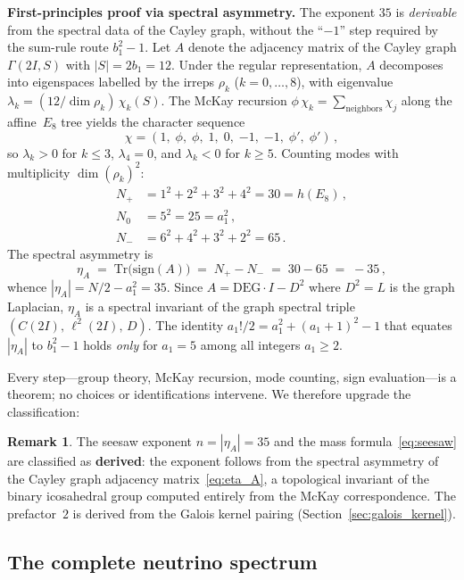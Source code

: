\documentclass[12pt,a4paper]{article}
\theoremstyle{definition}
\newtheorem{remark}{Remark}
\begin{document}
\textbf{First-principles proof via spectral asymmetry.}
The exponent $35$ is \emph{derivable} from the spectral data of the Cayley graph, without the ``$-1$'' step required by the sum-rule route $b_1^2 - 1$.  Let $A$ denote the adjacency matrix of the Cayley graph $\Gamma(2I, S)$ with $|S| = 2b_1 = 12$.  Under the regular representation, $A$ decomposes into eigenspaces labelled by the irreps $\rho_k$ ($k = 0, \ldots, 8$), with eigenvalue $\lambda_k = (12/\dim\rho_k)\,\chi_k(S)$.  The McKay recursion $\phi\,\chi_k = \sum_{\text{neighbors}}\chi_j$ along the affine~$E_8$ tree yields the character sequence
\[
\chi = (1,\;\phi,\;\phi,\;1,\;0,\;{-1},\;{-1},\;\phi',\;\phi')\,,
\]
so $\lambda_k > 0$ for $k \le 3$, $\lambda_4 = 0$, and $\lambda_k < 0$ for $k \ge 5$.  Counting modes with multiplicity $\dim(\rho_k)^2$:
\begin{align}
N_+ &= 1^2 + 2^2 + 3^2 + 4^2 = 30 = h(E_8)\,,\\
N_0 &= 5^2 = 25 = a_1^2\,,\\
N_- &= 6^2 + 4^2 + 3^2 + 2^2 = 65\,.
\end{align}
The spectral asymmetry is
\begin{equation}
\eta_A \;=\; \mathrm{Tr}\bigl(\mathrm{sign}(A)\bigr) \;=\; N_+ - N_- \;=\; 30 - 65 \;=\; -35\,,
\label{eq:eta_A}
\end{equation}
whence $|\eta_A| = N/2 - a_1^2 = 35$.  Since $A = \mathrm{DEG}\cdot I - D^2$ where $D^2 = L$ is the graph Laplacian, $\eta_A$ is a spectral invariant of the graph spectral triple $(C(2I),\,\ell^2(2I),\,D)$.  The identity $a_1!/2 = a_1^2 + (a_1{+}1)^2 - 1$ that equates $|\eta_A|$ to $b_1^2 - 1$ holds \emph{only} for $a_1 = 5$ among all integers $a_1 \ge 2$.

Every step---group theory, McKay recursion, mode counting, sign evaluation---is a theorem; no choices or identifications intervene.  We therefore upgrade the classification:

\begin{remark}
The seesaw exponent $n = |\eta_A| = 35$ and the mass formula~\eqref{eq:seesaw} are classified as \textbf{derived}: the exponent follows from the spectral asymmetry of the Cayley graph adjacency matrix~\eqref{eq:eta_A}, a topological invariant of the binary icosahedral group computed entirely from the McKay correspondence.  The prefactor~$2$ is derived from the Galois kernel pairing (Section~\ref{sec:galois_kernel}).
\end{remark}

\subsection{The complete neutrino spectrum}\label{sec:nu_spectrum}
\end{document}
